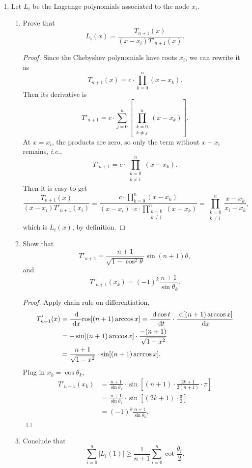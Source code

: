 \begin{enumerate}
	\item Let $L_i$ be the Lagrange polynomials associated to the node $x_i$.
	\begin{enumerate}
		\item Prove that
		\[ L_i(x)=\frac{T_{n+1}(x)}{(x-x_i)T'_{n+1}(x)}. \]
		\begin{proof}
		Since the Chebyshev polynomials have roots $x_i$, we can rewrite it as
		\[ T_{n+1}(x)=c\cdot\prod_{k=0}^{n}(x-x_k). \]
		Then its derivative is
		\[ T'_{n+1}=c\cdot\sum_{j=0}^{n}\left[\prod_{\substack{k=0\\k\neq j}}^n(x-x_k) \right]. \]
		At \(x=x_i\), the products are zero, so only the term without \(x-x_i\) remains, \textit{i.e.},
		\[ T'_{n+1}=c\cdot\prod_{\substack{k=0\\k\neq i}}^n(x-x_k). \]
		Then it is easy to get
		\[ \frac{T_{n+1}(x)}{(x-x_i)T'_{n+1}(x_i)}=\frac{c\cdot\prod_{k=0}^n(x-x_k)}{(x-x_i)\cdot c\cdot\prod_{\substack{k=0\\k\neq i}}^n(x-x_k)}=\prod_{\substack{k=0\\k\neq i}}^n\frac{x-x_k}{x_i-x_k}, \]
		which is \(L_i(x)\), by definition.
		\end{proof}
		\item Show that
		\[ T'_{n+1}=\frac{n+1}{\sqrt{1-\cos^2\theta}}\sin(n+1)\theta, \]
		and
		\[ T'_{n+1}(x_k)=(-1)^k\frac{n+1}{\sin\theta_k}. \]
		\begin{proof}
		Apply chain rule on differentiation,
		\begin{align*}
			T'_{n+1}(x)&=\frac{~\mathrm{d}^{}}{~\mathrm{d}{x}^{}}{\cos[(n+1)\arccos x]}=\frac{~\mathrm{d}\cos t}{~\mathrm{d} t}\cdot\frac{~\mathrm{d}[(n+1)\arccos x]}{~\mathrm{d} x}\\
			&=-\sin[(n+1)\arccos x]\cdot\frac{-(n+1)}{\sqrt{1-x^2}}\\
			&=\frac{n+1}{\sqrt{1-x^2}}\cdot\sin[(n+1)\arccos x].
		\end{align*}
		Plug in \(x_k=\cos\theta_k\),
		\begin{align*}
			T'_{n+1}(x_k)&=\frac{n+1}{\sin\theta_k}\cdot\sin\left[(n+1)\cdot\frac{2k+1}{2(n+1)}\cdot\pi \right]\\
			&=\frac{n+1}{\sin\theta_k}\cdot\sin\left[(2k+1)\cdot\frac{\pi}{2}\right]\\
			&=(-1)^k\frac{n+1}{\sin\theta_k}.
		\end{align*}
		\end{proof}
		\item Conclude that
		\[ \sum_{i=0}^n|L_i(1)|\geq\frac{1}{n+1}\sum_{i=0}^n\cot \frac{\theta_i}{2}. \]

\end{enumerate}
\end{enumerate}
